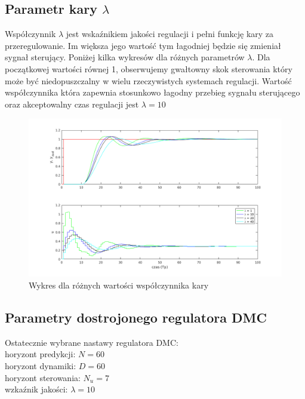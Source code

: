 \documentclass[a4paper, 11pt]{article}
\begin{document}
\subsection{Parametr kary $\lambda$}
Współczynnik $\lambda$ jest wskaźnikiem jakości regulacji i pełni funkcję kary za przeregulowanie. Im większa jego wartość tym łagodniej będzie się zmieniał sygnał sterujący. Poniżej kilka wykresów dla różnych parametrów $\lambda$. Dla początkowej wartości równej 1, obserwujemy gwałtowny skok sterowania który może być niedopuszczalny w wielu rzeczywistych systemach regulacji. Wartość współczynnika która zapewnia stosunkowo łagodny przebieg sygnału sterującego oraz akceptowalny czas regulacji jest $\lambda = 10$

\begin{figure}[H]
\centering
\includegraphics[scale=0.60]{lambda_dmc.png}
\caption{Wykres dla różnych wartości współczynnika kary}
\end{figure}
\subsection{Parametry dostrojonego regulatora DMC}

Ostatecznie wybrane nastawy regulatora DMC:\\

horyzont predykcji: $N = 60$\\

horyzont dynamiki: $D = 60$\\

horyzont sterowania: $N_u = 7$\\

wzkaźnik jakości: $\lambda = 10$\\
\end{document}
